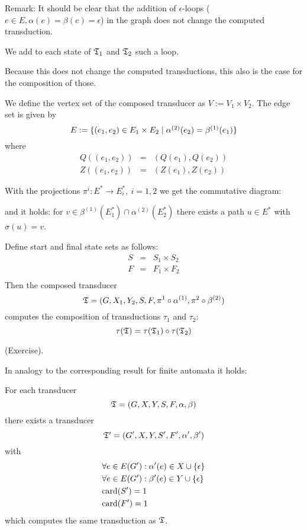 Remark: It should be clear that the addition of $\epsilon$-loops ($e \in E,
\alpha(e) = \beta(e) = \epsilon$) in the graph does not change the computed
transduction.

We add to each state of $\mbox{$\mathfrak{T}$}_1$ and $\mbox{$\mathfrak{T}$}_2$ such a loop.

Because this does not change the computed transductions, this also is the case
for the composition of those.

We define the vertex set of the composed transducer as $V := V_1 \times V_2$.
The edge set is given by
\[ E := \mbox{$\{(e_1, e_2) \in E_1 \times E_2 \mid \alpha^{(2)}(e_2) =
\beta^{(1)}(e_1)\}$} \]
where
\begin{eqnarray*}
Q((e_1, e_2)) & = & (Q(e_1), Q(e_2)) \\
Z((e_1, e_2)) & = & (Z(e_1), Z(e_2)) 
\end{eqnarray*}

With the projections $\pi^i : E^* \to E_i^*,\ i = 1,2$ we get the commutative
diagram:

\begin{center}
\end{center}

and it holds: for $v \in \beta^{(1)}(E_1^*) \cap \alpha^{(2)}(E_2^*)$ there
exists a path $u \in E^*$ with $\sigma(u) = v$.

Define start and final state sets as follows:
\begin{eqnarray*}
S & = & S_1 \times S_2 \\
F & = & F_1 \times F_2 \\
\end{eqnarray*}
Then the composed transducer
\[\mbox{$\mathfrak{T}$} = (G, X_1, Y_2, S, F, \pi^1 \circ \alpha^{(1)}, \pi^2 \circ
\beta^{(2)})\]
computes the composition of transductions $\tau_1$ and $\tau_2$:
\[ \tau(\mbox{$\mathfrak{T}$}) = \tau(\mbox{$\mathfrak{T}$}_1) \circ \tau(\mbox{$\mathfrak{T}$}_2) \]

(Exercise).

In analogy to the corresponding result for finite automata it holds:

\begin{lemma}
For each transducer
\[\mbox{$\mathfrak{T}$} = (G, X, Y, S, F, \alpha, \beta)\] there exists a
transducer \[\mbox{$\mathfrak{T'}$} = (G', X, Y, S', F', \alpha', \beta')\] with
\begin{eqnarray*}
& \forall e \in E(G'): \alpha'(e) \in X \cup \mbox{$\{\epsilon\}$} \\
& \forall e \in E(G'): \beta'(e) \in Y \cup \mbox{$\{\epsilon\}$} \\
& \mathrm{card}(S') = 1 \\
& \mathrm{card}(F') = 1
\end{eqnarray*}
which computes the same transduction as $\mbox{$\mathfrak{T}$}$.
\end{lemma}


